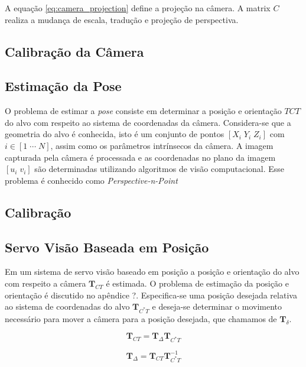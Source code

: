 A equação \eqref{eq:camera_projection} define a projeção na câmera. A matrix $C$ realiza a mudança de escala, tradução e projeção de perspectiva. 

\subsection{Calibração da Câmera}

\subsection{Estimação da Pose}
O problema de estimar a \textit{pose} consiste em determinar a posição e orientação $T{CT}$ do alvo com respeito ao sistema de coordenadas da câmera. Considera-se que a geometria do alvo é conhecida, isto é um conjunto de pontos $[X_i \; Y_i \; Z_i]$ com $i \in [1\; \cdots \; N]$, assim como os parâmetros intrínsecos da câmera. A imagem capturada pela câmera é processada e as coordenadas no plano da imagem $[u_i\; v_i]$ são determinadas utilizando algoritmos de visão computacional. Esse problema é conhecido como \textit{Perspective-n-Point}

\subsection{Calibração}

\subsection{Servo Visão Baseada em Posição}
Em um sistema de servo visão baseado em posição a posição e orientação do alvo com respeito a câmera $\bm{T}_{CT}$ é estimada. O problema de estimação da posição e orientação é discutido no apêndice ?.
Especifica-se uma posição desejada relativa ao sistema de coordenadas do alvo  $\bm{T}_{C^*T}$ e deseja-se determinar o movimento necessário para mover a câmera para a posição desejada, que chamamos de $\bm{T}_\delta$.

\begin{equation}
 \bm{T}_{CT} =  \bm{T}_\Delta \bm{T}_{C^*T}
\end{equation}

\begin{equation}
 \bm{T}_\Delta  =   \bm{T}_{CT} \bm{T}_{C^*T}^{-1}
\end{equation}